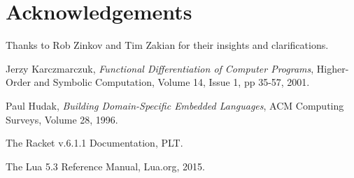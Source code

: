 \documentclass[font=9pt]{article}
\begin{document}
\section{Acknowledgements}
Thanks to Rob Zinkov and Tim Zakian for their insights and clarifications.

\begin{thebibliography}{9}
        Jerzy Karczmarczuk,
        \emph{Functional Differentiation of Computer Programs},
        Higher-Order and Symbolic Computation,
        Volume 14, Issue 1, pp 35-57,
        2001.

        Paul Hudak,
        \emph{Building Domain-Specific Embedded Languages},
        ACM Computing Surveys,
        Volume 28,
        1996.

        The Racket v.6.1.1 Documentation, PLT.

        The Lua 5.3 Reference Manual, Lua.org, 2015.

\end{thebibliography}
\end{document}

